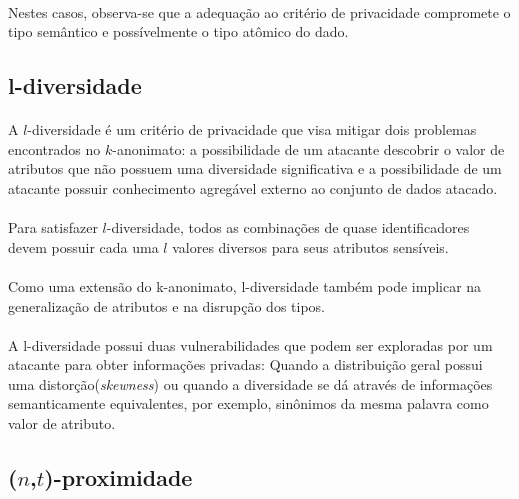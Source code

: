 \paragraph{} Nestes casos, observa-se que a adequação ao critério de privacidade compromete o tipo semântico e possívelmente o tipo atômico do dado.

\subsection{l-diversidade}

\paragraph{} A $l$-diversidade\cite{ldiversity} é um critério de privacidade que visa mitigar dois problemas encontrados no $k$-anonimato: a possibilidade de um atacante descobrir o valor de atributos que não possuem uma diversidade significativa e a possibilidade de um atacante possuir conhecimento agregável externo ao conjunto de dados atacado.

\paragraph{} Para satisfazer $l$-diversidade, todos as combinações de quase identificadores devem possuir cada uma $l$ valores diversos para seus atributos sensíveis.

\paragraph{} Como uma extensão do k-anonimato, l-diversidade também pode implicar na generalização de atributos e na disrupção dos tipos.

\paragraph{} A l-diversidade possui duas vulnerabilidades\cite{tproximity} que podem ser exploradas por um atacante para obter informações privadas: Quando a distribuição geral possui uma distorção(\textit{skewness}) ou quando a diversidade se dá através de informações semanticamente equivalentes, por exemplo, sinônimos da mesma palavra como valor de atributo. 

\subsection{($n$,$t$)-proximidade}

